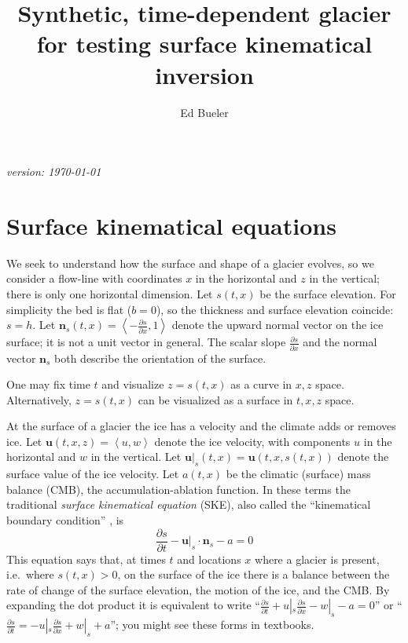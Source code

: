 \documentclass[letterpaper,final,12pt,reqno]{amsart}
\newcommand{\bn}{\mathbf{n}}
\newcommand{\bu}{\mathbf{u}}
\begin{document}

\title[Synthetic, time-dependent glacier]{Synthetic, time-dependent glacier \\ for testing surface kinematical inversion}

\author{Ed Bueler}

\maketitle

\begin{center}
{\footnotesize
\emph{version: \today}}
\end{center}

\thispagestyle{empty}

\section{Surface kinematical equations}  We seek to understand how the surface and shape of a glacier evolves, so we consider a flow-line with coordinates $x$ in the horizontal and $z$ in the vertical; there is only one horizontal dimension.  Let $s(t,x)$ be the surface elevation.  For simplicity the bed is flat ($b=0$), so the thickness and surface elevation coincide: $s=h$.  Let $\bn_s(t,x) = \left<-\frac{\partial s}{\partial x},1\right>$ denote the upward normal vector on the ice surface; it is not a unit vector in general.  The scalar slope $\frac{\partial s}{\partial x}$ and the normal vector $\bn_s$ both describe the orientation of the surface.

One may fix time $t$ and visualize $z=s(t,x)$ as a curve in $x,z$ space.  Alternatively, $z=s(t,x)$ can be visualized as a surface in $t,x,z$ space.

At the surface of a glacier the ice has a velocity and the climate adds or removes ice.  Let $\bu(t,x,z)=\left<u,w\right>$ denote the ice velocity, with components $u$ in the horizontal and $w$ in the vertical.  Let $\bu|_s(t,x) = \bu(t,x,s(t,x))$ denote the surface value of the ice velocity.  Let $a(t,x)$ be the climatic (surface) mass balance (CMB), the accumulation-ablation function.  In these terms the traditional \emph{surface kinematical equation} (SKE), also called the ``kinematical boundary condition'' \cite{FowlerNg2021,GreveBlatter2009}, is
\begin{equation}
\frac{\partial s}{\partial t} - \bu|_s \cdot \bn_s - a = 0  \label{ske}
\end{equation}
This equation says that, at times $t$ and locations $x$ where a glacier is present, i.e.~where $s(t,x)>0$, on the surface of the ice there is a balance between the rate of change of the surface elevation, the motion of the ice, and the CMB.  By expanding the dot product it is equivalent to write ``$\frac{\partial s}{\partial t} + u|_s \frac{\partial s}{\partial x} - w|_s - a = 0$'' or ``$\frac{\partial s}{\partial t} = - u|_s \frac{\partial s}{\partial x} + w|_s + a$''; you might see these forms in textbooks.
\end{document}
